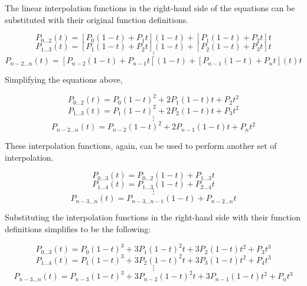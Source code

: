 \documentclass[12pt, oneside]{article}   	%
\numberwithin{figure}{section}
\begin{document}
The linear interpolation functions in the right-hand side of the equations can be substituted with their original function definitions.

\begin{displaymath}
P_{0...2}(t)=[P_{0}(1-t)+P_{1}t](1-t)+[P_{1}(1-t)+P_{2}t]t
\end{displaymath}
\begin{displaymath}
P_{1...3}(t)=[P_{1}(1-t)+P_{2}t](1-t)+[P_{2}(1-t)+P_{3}t]t
\end{displaymath}
\begin{displaymath}
\vdots
\end{displaymath}
\begin{displaymath}
P_{n-2...n}(t)=[P_{n-2}(1-t)+P_{n-1}t](1-t)+[P_{n-1}(1-t)+P_{n}t](t)t
\end{displaymath}

Simplifying the equations above,

\begin{displaymath}
P_{0...2}(t)=P_{0}(1-t)^2+2P_{1}(1-t)t+P_{2}t^2
\end{displaymath}
\begin{displaymath}
P_{1...3}(t)=P_{1}(1-t)^2+2P_{2}(1-t)t+P_{3}t^2
\end{displaymath}
\begin{displaymath}
\vdots
\end{displaymath}
\begin{displaymath}
P_{n-2...n}(t)=P_{n-2}(1-t)^2+2P_{n-1}(1-t)t+P_{n}t^2
\end{displaymath}

These interpolation functions, again, can be used to perform another set of interpolation.

\begin{displaymath}
P_{0...3}(t)=P_{0...2}(1-t)+P_{1...3}t
\end{displaymath}
\begin{displaymath}
P_{1...4}(t)=P_{1...3}(1-t)+P_{2...4}t
\end{displaymath}
\begin{displaymath}
\vdots
\end{displaymath}
\begin{displaymath}
P_{n-3...n}(t)=P_{n-3...n-1}(1-t)+P_{n-2...n}t
\end{displaymath}

Substituting the interpolation functions in the right-hand side with their function definitions simplifies to be the following:

\begin{displaymath}
P_{0...3}(t)=P_{0}(1-t)^{3}+3P_{1}(1-t)^{2}t+3P_{2}(1-t)t^2+P_{3}t^3
\end{displaymath}
\begin{displaymath}
P_{1...4}(t)=P_{1}(1-t)^{3}+3P_{2}(1-t)^{2}t+3P_{3}(1-t)t^2+P_{4}t^3
\end{displaymath}
\begin{displaymath}
\vdots
\end{displaymath}
\begin{displaymath}
P_{n-3...n}(t)=P_{n-3}(1-t)^{3}+3P_{n-2}(1-t)^{2}t+3P_{n-1}(1-t)t^2+P_{n}t^3
\end{displaymath}
\end{document}
